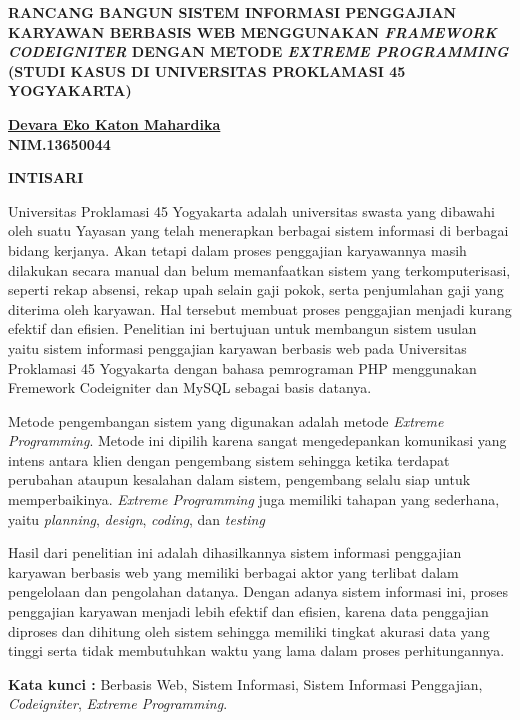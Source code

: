 \documentclass{jtetiskripsi}
\begin{document}
\begin{abstractind}
\begin{center}
    \textbf{RANCANG BANGUN SISTEM INFORMASI PENGGAJIAN KARYAWAN BERBASIS WEB MENGGUNAKAN \emph{FRAMEWORK CODEIGNITER} DENGAN METODE \emph{EXTREME PROGRAMMING}}\\
    \textbf{(STUDI KASUS DI UNIVERSITAS PROKLAMASI 45 YOGYAKARTA)}
\end{center}

\begin{center}
    \textbf{\underline{Devara Eko Katon Mahardika}\\NIM.13650044}
\end{center}

\begin{center}
    \textbf{INTISARI}
\end{center}

Universitas Proklamasi 45 Yogyakarta adalah universitas swasta yang dibawahi oleh suatu Yayasan yang telah menerapkan berbagai sistem informasi di berbagai bidang kerjanya. Akan tetapi dalam proses penggajian karyawannya masih dilakukan secara manual dan belum memanfaatkan sistem yang terkomputerisasi, seperti rekap absensi, rekap upah selain gaji pokok, serta penjumlahan gaji yang diterima oleh karyawan. Hal tersebut membuat proses penggajian menjadi kurang efektif dan efisien. Penelitian ini bertujuan untuk membangun sistem usulan yaitu sistem informasi penggajian karyawan berbasis web pada Universitas Proklamasi 45 Yogyakarta dengan bahasa pemrograman PHP menggunakan Fremework Codeigniter dan MySQL sebagai basis datanya.

Metode pengembangan sistem yang digunakan adalah metode \emph{Extreme Programming}. Metode ini dipilih karena sangat mengedepankan komunikasi yang intens antara klien dengan pengembang sistem sehingga ketika terdapat perubahan ataupun kesalahan dalam sistem, pengembang selalu siap untuk memperbaikinya. \emph{Extreme Programming} juga memiliki tahapan yang sederhana, yaitu \emph{planning}, \emph{design}, \emph{coding}, dan \emph{testing}

Hasil dari penelitian ini adalah dihasilkannya sistem informasi penggajian karyawan berbasis web yang memiliki berbagai aktor yang terlibat dalam pengelolaan dan pengolahan datanya. Dengan adanya sistem informasi ini, proses penggajian karyawan menjadi lebih efektif dan efisien, karena data penggajian diproses dan dihitung oleh sistem sehingga memiliki tingkat akurasi data yang tinggi serta tidak membutuhkan waktu yang lama dalam proses perhitungannya.

\bigskip
\noindent
\textbf{Kata kunci :} Berbasis Web, Sistem Informasi, Sistem Informasi Penggajian, \emph{Codeigniter}, \emph{Extreme Programming}.
\end{abstractind}
\end{document}
